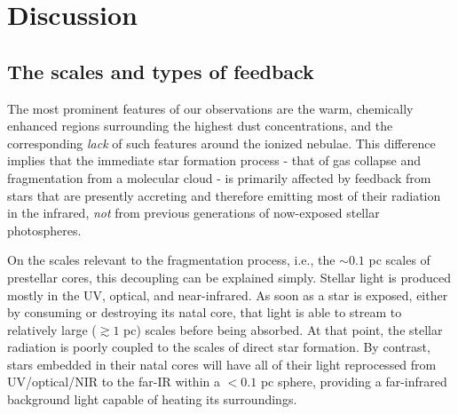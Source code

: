 \documentclass{emulateapj}
\begin{document}
%
%



\section{Discussion}
\label{sec:discussion}
\subsection{The scales and types of feedback}
\label{sec:feedbackscales}
The most prominent features of our observations are the warm, chemically
enhanced regions surrounding the highest dust concentrations, and the
corresponding \emph{lack} of such features around the ionized nebulae.  This
difference implies that the immediate star formation process - that of gas
collapse and fragmentation from a molecular cloud - is primarily affected by
feedback from stars that are presently accreting and therefore emitting most of
their radiation in the infrared, \emph{not} from previous generations of
now-exposed stellar photospheres.

On the scales relevant to the fragmentation process, i.e., the $\sim0.1$ pc
scales of prestellar cores, this decoupling can be explained simply.  Stellar
light is produced mostly in the UV, optical, and near-infrared.  As soon as a
star is exposed, either by consuming or destroying its natal core, that light
is able to stream to relatively large ($\gtrsim1$ pc) scales before being
absorbed.  At that point, the stellar radiation is poorly coupled to the scales
of direct star formation.  By contrast, stars embedded in their natal cores
will have all of their light reprocessed from UV/optical/NIR to the far-IR
within a $<0.1$ pc sphere, providing a far-infrared background light capable of
heating its surroundings.
\end{document}
